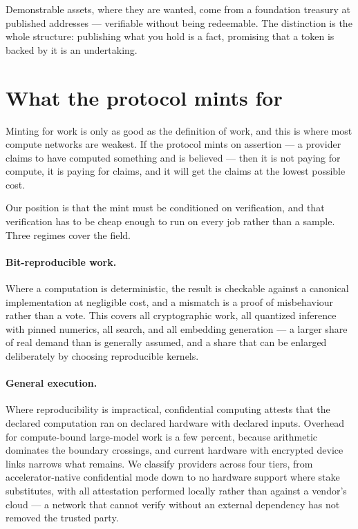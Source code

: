 \documentclass[11pt,a4paper]{article}
\begin{document}
Demonstrable assets, where they are wanted, come from a foundation treasury at
published addresses --- verifiable without being redeemable. The distinction is
the whole structure: publishing what you hold is a fact, promising that a token
is backed by it is an undertaking.

\section{What the protocol mints for}

Minting for work is only as good as the definition of work, and this is where
most compute networks are weakest. If the protocol mints on assertion --- a
provider claims to have computed something and is believed --- then it is not
paying for compute, it is paying for claims, and it will get the claims at the
lowest possible cost.

Our position is that the mint must be conditioned on verification, and that
verification has to be cheap enough to run on every job rather than a sample.
Three regimes cover the field.

\paragraph{Bit-reproducible work.} Where a computation is deterministic, the
result is checkable against a canonical implementation at negligible cost, and a
mismatch is a proof of misbehaviour rather than a vote. This covers all
cryptographic work, all quantized inference with pinned numerics, all search, and
all embedding generation --- a larger share of real demand than is generally
assumed, and a share that can be enlarged deliberately by choosing reproducible
kernels.

\paragraph{General execution.} Where reproducibility is impractical,
confidential computing attests that the declared computation ran on declared
hardware with declared inputs. Overhead for compute-bound large-model work is a
few percent, because arithmetic dominates the boundary crossings, and current
hardware with encrypted device links narrows what remains. We classify providers
across four tiers, from accelerator-native confidential mode down to no hardware
support where stake substitutes, with all attestation performed locally rather
than against a vendor's cloud --- a network that cannot verify without an
external dependency has not removed the trusted party.
\end{document}
